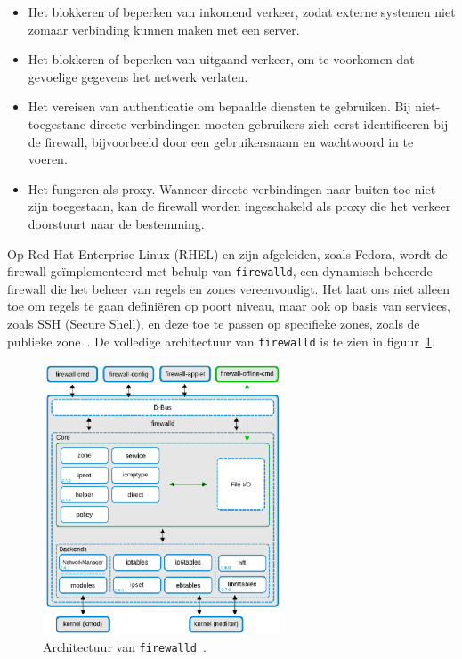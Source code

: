 \begin{itemize}
    \item Het blokkeren of beperken van inkomend verkeer, zodat externe systemen niet zomaar verbinding kunnen maken met een server.
    \item Het blokkeren of beperken van uitgaand verkeer, om te voorkomen dat gevoelige gegevens het netwerk verlaten.
    \item Het vereisen van authenticatie om bepaalde diensten te gebruiken. Bij niet-toegestane directe verbindingen moeten gebruikers zich eerst identificeren bij de firewall, bijvoorbeeld door een gebruikersnaam en wachtwoord in te voeren.
    \item Het fungeren als proxy. Wanneer directe verbindingen naar buiten toe niet zijn toegestaan, kan de firewall worden ingeschakeld als proxy die het verkeer doorstuurt naar de bestemming.
\end{itemize}

Op Red Hat Enterprise Linux (RHEL) en zijn afgeleiden, zoals Fedora, wordt de firewall ge\"implementeerd met behulp van \texttt{firewalld}, een dynamisch beheerde firewall die het beheer van regels en zones vereenvoudigt.
Het laat ons niet alleen toe om regels te gaan defini\"eren op poort niveau, maar ook op basis van services, zoals SSH (Secure Shell), en deze toe te passen op specifieke zones, zoals de publieke zone~\autocite{dakic2022linux}.
De volledige architectuur van \texttt{firewalld} is te zien in figuur~\ref{fig:firewalld-architecture}.

\begin{figure}[h!]
    \begin{center}
        \includegraphics[width=200pt]
        {./graphics/linux/firewalld-architecture.png}
        \caption{\label{fig:firewalld-architecture}Architectuur van \texttt{firewalld}~\autocite{dakic2022linux}.}
    \end{center}
\end{figure}


